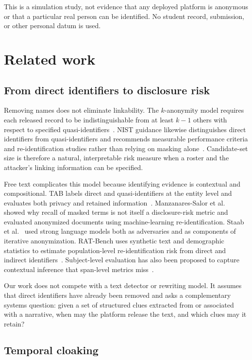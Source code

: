 \documentclass[pdflatex,sn-mathphys-num]{sn-jnl}
\theoremstyle{plain}
\begin{document}
This is a simulation study, not evidence that any deployed platform is anonymous or that a particular real person can be identified. No student record, submission, or other personal datum is used.

\section{Related work}\label{sec:related}

\subsection{From direct identifiers to disclosure risk}

Removing names does not eliminate linkability. The $k$-anonymity model requires each released record to be indistinguishable from at least $k-1$ others with respect to specified quasi-identifiers~\cite{sweeney2002}. NIST guidance likewise distinguishes direct identifiers from quasi-identifiers and recommends measurable performance criteria and re-identification studies rather than relying on masking alone~\cite{nist2023}. Candidate-set size is therefore a natural, interpretable risk measure when a roster and the attacker's linking information can be specified.

Free text complicates this model because identifying evidence is contextual and compositional. TAB labels direct and quasi-identifiers at the entity level and evaluates both privacy and retained information~\cite{pilan2022}. Manzanares-Salor et al.~\cite{manzanares2024} showed why recall of masked terms is not itself a disclosure-risk metric and evaluated anonymized documents using machine-learning re-identification. Staab et al.~\cite{staab2025} used strong language models both as adversaries and as components of iterative anonymization. RAT-Bench uses synthetic text and demographic statistics to estimate population-level re-identification risk from direct and indirect identifiers~\cite{krco2026}. Subject-level evaluation has also been proposed to capture contextual inference that span-level metrics miss~\cite{oh2026}.

Our work does not compete with a text detector or rewriting model. It assumes that direct identifiers have already been removed and asks a complementary systems question: given a set of structured clues extracted from or associated with a narrative, when may the platform release the text, and which clues may it retain?

\subsection{Temporal cloaking}
\end{document}
